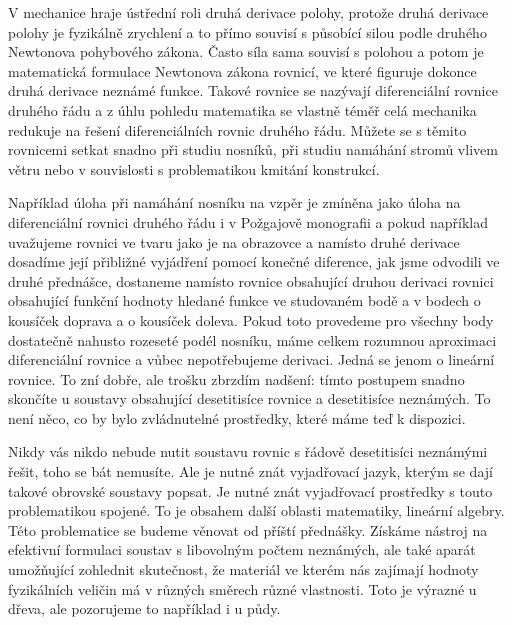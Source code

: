 \documentclass[12pt]{article}
\begin{document}
V mechanice hraje ústřední roli druhá derivace polohy, protože druhá derivace polohy je fyzikálně zrychlení a to přímo souvisí s působící silou podle druhého Newtonova pohybového zákona. Často síla sama souvisí s polohou a potom je matematická formulace Newtonova zákona rovnicí, ve které figuruje dokonce druhá derivace neznámé funkce. Takové rovnice se nazývají diferenciální rovnice druhého řádu a z úhlu pohledu matematika se vlastně téměř celá mechanika redukuje na řešení diferenciálních rovnic druhého řádu. Můžete se s těmito rovnicemi setkat snadno při studiu nosníků, při studiu namáhání stromů vlivem větru nebo v souvislosti s problematikou kmitání konstrukcí. 

Například úloha při namáhání nosníku na vzpěr je zmíněna jako úloha na diferenciální rovnici druhého řádu i v Požgajově monografii a pokud například uvažujeme rovnici ve tvaru jako je na obrazovce a namísto druhé derivace dosadíme její přibližné vyjádření pomocí konečné diference, jak jsme odvodili ve druhé přednášce, dostaneme namísto rovnice obsahující druhou derivaci rovnici obsahující funkční hodnoty hledané funkce ve studovaném bodě a v bodech o kousíček doprava a o kousíček doleva. Pokud toto provedeme pro všechny body dostatečně nahusto rozeseté podél nosníku, máme celkem rozumnou aproximaci diferenciální rovnice a vůbec nepotřebujeme derivaci. Jedná se jenom o lineární rovnice. To zní dobře, ale trošku zbrzdím nadšení: tímto postupem snadno skončíte u soustavy obsahující desetitisíce rovnice a desetitisíce neznámých. To není něco, co by bylo zvládnutelné prostředky, které máme teď k dispozici.

Nikdy vás nikdo nebude nutit soustavu rovnic s řádově desetitisíci neznámými řešit, toho se bát nemusíte. Ale je nutné znát vyjadřovací jazyk, kterým se dají takové obrovské soustavy popsat. Je nutné znát vyjadřovací prostředky s touto problematikou spojené. To je obsahem další oblasti matematiky, lineární algebry. Této problematice se budeme věnovat od příští přednášky. Získáme nástroj na efektivní formulaci soustav s libovolným počtem neznámých, ale také aparát umožňující zohlednit skutečnost, že materiál ve kterém nás zajímají hodnoty fyzikálních veličin má v různých směrech různé vlastnosti. Toto je výrazné u dřeva, ale pozorujeme to například i u půdy. 
\end{document}
